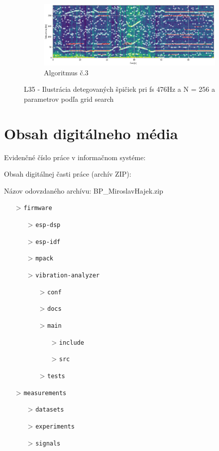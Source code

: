 \begin{figure}[h]
      \begin{subfigure}{\textwidth}
    	\centering
        \includegraphics[width=\textwidth]{figures/verification/L35-dataset-A3.png}
        \caption{Algoritmus č.3}
     \end{subfigure}
     \caption{L35 - Ilustrácia detegovaných špičiek pri fs 476Hz a N = 256 a parametrov podľa grid search}
\end{figure}

\thispagestyle{empty}
\setcounter{figure}{0}
\chapter{Obsah digitálneho média}
\renewcommand*{\thepage}{E-\arabic{page}}
\par Evidenčné číslo práce v informačnom systéme: \RegNo
\par Obsah digitálnej časti práce (archív ZIP):
\par Názov odovzdaného archívu: BP\_MiroslavHajek.zip

\begin{itemize}[noitemsep]
\item[>] \verb|firmware|
	\begin{itemize}
	\item[>] \verb|esp-dsp|
	\item[>] \verb|esp-idf|
	\item[>] \verb|mpack|
	\item[>] \verb|vibration-analyzer|
		\begin{itemize}
		\item[>] \verb|conf|
		\item[>] \verb|docs|
		\item[>] \verb|main|
			\begin{itemize}
			\item[>] \verb|include|
			\item[>] \verb|src|
			\end{itemize}
		\item[>] \verb|tests|
		\end{itemize}
	\end{itemize}
\item[>] \verb|measurements|
	\begin{itemize}
	\item[>] \verb|datasets|
	\item[>] \verb|experiments|
	\item[>] \verb|signals|
	\end{itemize}
\end{itemize}
